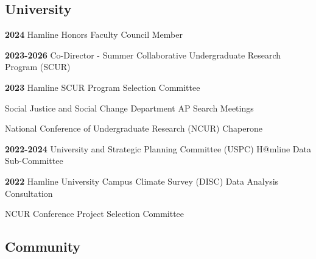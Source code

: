 \documentclass[letterpaper]{article}
\newenvironment{publist}{%
  \begin{list}{}{%
    \setlength{\leftmargin}{0cm}   %
    \setlength{\labelwidth}{2cm}     %
    \setlength{\labelsep}{0.5cm}     %
  }%
}{%
  \end{list}%
}
\begin{document}
\subsection*{University}
\begin{publist}
\item[\textbf{2024}] Hamline Honors Faculty Council Member
\item[\textbf{2023-2026}] Co-Director - Summer Collaborative Undergraduate Research Program (SCUR)
\item[\textbf{2023}] Hamline SCUR Program Selection Committee
\item Social Justice and Social Change Department AP Search Meetings
\item National Conference of Undergraduate Research (NCUR) Chaperone
\item[\textbf{2022-2024}]University and Strategic Planning Committee (USPC) H@mline Data Sub-Committee
\item[\textbf{2022}] Hamline University Campus Climate Survey (DISC) Data Analysis Consultation
\item NCUR Conference Project Selection Committee
\end{publist}

\subsection*{Community}
\end{document}

